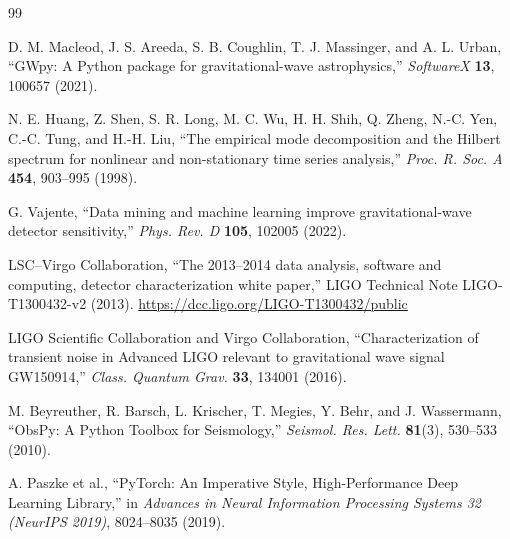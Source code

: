\documentclass[preprint,12pt,a4paper]{elsarticle}
\begin{document}
\begin{thebibliography}{99}

D. M. Macleod, J. S. Areeda, S. B. Coughlin, T. J. Massinger, and A. L. Urban,
``GWpy: A Python package for gravitational-wave astrophysics,''
\textit{SoftwareX} \textbf{13}, 100657 (2021). 

N. E. Huang, Z. Shen, S. R. Long, M. C. Wu, H. H. Shih, Q. Zheng, N.-C. Yen, C.-C. Tung, and H.-H. Liu,
``The empirical mode decomposition and the Hilbert spectrum for nonlinear and non-stationary time series analysis,''
\textit{Proc. R. Soc. A} \textbf{454}, 903--995 (1998). 

G. Vajente,
``Data mining and machine learning improve gravitational-wave detector sensitivity,''
\textit{Phys. Rev. D} \textbf{105}, 102005 (2022). 

LSC--Virgo Collaboration, ``The 2013--2014 data analysis, software and computing, detector characterization white paper,'' LIGO Technical Note LIGO-T1300432-v2 (2013). \url{https://dcc.ligo.org/LIGO-T1300432/public}

LIGO Scientific Collaboration and Virgo Collaboration,
``Characterization of transient noise in Advanced LIGO relevant to gravitational wave signal GW150914,''
\textit{Class. Quantum Grav.} \textbf{33}, 134001 (2016). 

M. Beyreuther, R. Barsch, L. Krischer, T. Megies, Y. Behr, and J. Wassermann,
``ObsPy: A Python Toolbox for Seismology,''
\textit{Seismol. Res. Lett.} \textbf{81}(3), 530--533 (2010). 

A. Paszke et al., ``PyTorch: An Imperative Style, High-Performance Deep Learning Library,'' in \textit{Advances in Neural Information Processing Systems 32 (NeurIPS 2019)}, 8024--8035 (2019).

\end{thebibliography}
\end{document}
